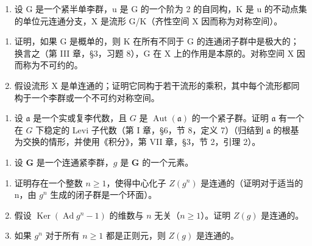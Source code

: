 \begin{enumerate}
\def\labelenumi{\arabic{enumi})}
\setcounter{enumi}{7}
\tightlist
\item
  设 G 是一个紧半单李群，u 是 G 的一个阶为 2 的自同构，K 是 u 的不动点集的单位元连通分支，X 是流形 G/K（齐性空间 X 因而称为对称空间）。
\end{enumerate}

\begin{enumerate}
\def\labelenumi{\alph{enumi})}
\item
  证明，如果 G 是概单的，则 K 在所有不同于 G 的连通闭子群中是极大的；换言之（第 III 章，§3，习题 8），G 在 X 上的作用是本原的。对称空间 X 因而称为不可约的。
\item
  假设流形 X 是单连通的；证明它同构于若干流形的乘积，其中每个流形都同构于一个李群或一个不可约对称空间。
\end{enumerate}

\begin{enumerate}
\def\labelenumi{\arabic{enumi})}
\setcounter{enumi}{8}
\tightlist
\item
  设 \(\mathfrak{a}\) 是一个实或复李代数，且 \(G\) 是 \(\operatorname{Aut}(\mathfrak{a})\) 的一个紧子群。证明 \(\mathfrak{a}\) 有一个在 \(G\) 下稳定的 Levi 子代数（第 I 章，§6，节 8，定义 7）（归结到 \(\mathfrak{a}\) 的根基为交换的情形，并使用《积分》，第 VII 章，§3，节 2，引理 2）。
\end{enumerate}


\begin{enumerate}
\def\labelenumi{\arabic{enumi})}
\tightlist
\item
  设 \(\mathbf{G}\) 是一个连通紧李群，\(g\) 是 \(\mathbf{G}\) 的一个元素。
\end{enumerate}

\begin{enumerate}
\def\labelenumi{\alph{enumi})}
\item
  证明存在一个整数 \(n \geq 1\)，使得中心化子 \(Z(g^{n})\) 是连通的（证明对于适当的 n，由 \(g^{n}\) 生成的闭子群是一个环面）。
\item
  假设 \(\operatorname{Ker}(\operatorname{Ad}g^n - 1)\) 的维数与 \(n\) 无关（\(n \geq 1\)）。证明 \(Z(g)\) 是连通的。
\item
  如果 \(g^n\) 对于所有 \(n \geq 1\) 都是正则元，则 \(Z(g)\) 是连通的。
\end{enumerate}

